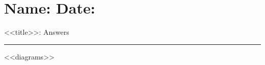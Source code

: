 \documentclass[12pt]{article}
\def \HeadingAnswers {\section*{\Large Name: \underline{\hspace{8cm}} \hfill Date: \underline{\hspace{3cm}}} \vspace{-3mm}
{<<title>>: Answers} \vspace{1pt}\hrule}
\begin{document}
\HeadingAnswers
\vspace{1mm}
\begin{multicols}{2}
  <<diagrams>>
\end{multicols}
\end{document}
